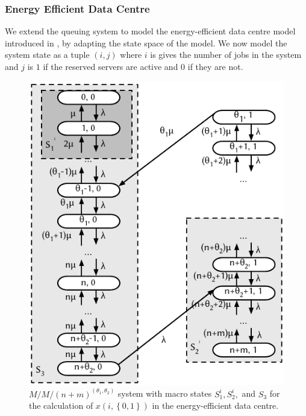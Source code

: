 \subsubsection*{Energy Efficient Data Centre}\label{sec:cloud:data_centers:modeling:energy_efficient}

We extend the queuing system to model the energy-efficient data centre model introduced in , by adapting the state space of the model.
We now model the system state as a tuple \((i,j)\) where \(i\) is gives the number of jobs in the system and \(j\) is \(1\) if the reserved servers are active and \(0\) if they are not.

\begin{figure}[H]
  \centering
  \includegraphics{cloud/data_centers/modeling/figures/state_diagram}
  \caption{\(M/M/(n+m)^{(\theta_1, \theta_2)}\) system with macro states \(S_1^i, S_2^i,\) and \(S_3\) for the calculation of \(x(i, \left\{0, 1\right\})\) in the energy-efficient data centre.}
  \label{fig:cloud:data_centers:modeling:energy_efficient:state_diagram}
\end{figure}

